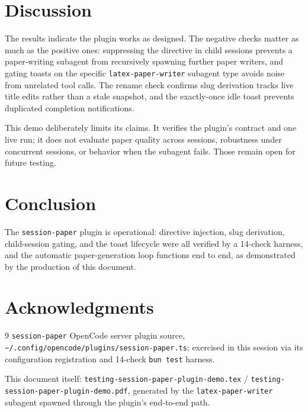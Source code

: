 \documentclass[11pt]{article}
\begin{document}
\section{Discussion}
\label{sec:discussion}

The results indicate the plugin works as designed. The negative checks matter as much as
the positive ones: suppressing the directive in child sessions prevents a paper-writing
subagent from recursively spawning further paper writers, and gating toasts on the
specific \texttt{latex-paper-writer} subagent type avoids noise from unrelated tool calls.
The rename check confirms slug derivation tracks live title edits rather than a stale
snapshot, and the exactly-once idle toast prevents duplicated completion notifications.

This demo deliberately limits its claims. It verifies the plugin's contract and one live
run; it does not evaluate paper quality across sessions, robustness under concurrent
sessions, or behavior when the subagent fails. Those remain open for future testing.

\section{Conclusion}
\label{sec:conclusion}

The \texttt{session-paper} plugin is operational: directive injection, slug derivation,
child-session gating, and the toast lifecycle were all verified by a 14-check harness, and
the automatic paper-generation loop functions end to end, as demonstrated by the
production of this document.

\section*{Acknowledgments}

\begin{thebibliography}{9}
\texttt{session-paper} OpenCode server plugin source,
\texttt{\textasciitilde/.config/opencode/plugins/session-paper.ts}; exercised in this
session via its configuration registration and 14-check \texttt{bun test} harness.

This document itself: \texttt{testing-session-paper-plugin-demo.tex} /
\texttt{testing-session-paper-plugin-demo.pdf}, generated by the
\texttt{latex-paper-writer} subagent spawned through the plugin's end-to-end path.
\end{thebibliography}
\end{document}
